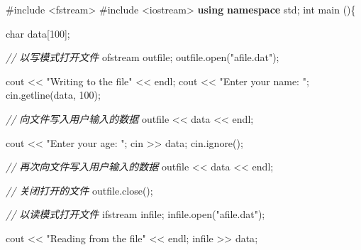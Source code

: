 \documentclass[
]{article}
\newenvironment{Shaded}{}{}
\newcommand{\CommentTok}[1]{\textcolor[rgb]{0.38,0.63,0.69}{\textit{#1}}}
\newcommand{\DataTypeTok}[1]{\textcolor[rgb]{0.56,0.13,0.00}{#1}}
\newcommand{\DecValTok}[1]{\textcolor[rgb]{0.25,0.63,0.44}{#1}}
\newcommand{\ImportTok}[1]{#1}
\newcommand{\KeywordTok}[1]{\textcolor[rgb]{0.00,0.44,0.13}{\textbf{#1}}}
\newcommand{\NormalTok}[1]{#1}
\newcommand{\OperatorTok}[1]{\textcolor[rgb]{0.40,0.40,0.40}{#1}}
\newcommand{\PreprocessorTok}[1]{\textcolor[rgb]{0.74,0.48,0.00}{#1}}
\newcommand{\StringTok}[1]{\textcolor[rgb]{0.25,0.44,0.63}{#1}}
\begin{document}
\begin{Shaded}
\begin{Highlighting}[]
\PreprocessorTok{\#include }\ImportTok{\textless{}fstream\textgreater{}}
\PreprocessorTok{\#include }\ImportTok{\textless{}iostream\textgreater{}}
\KeywordTok{using} \KeywordTok{namespace}\NormalTok{ std}\OperatorTok{;}
 \DataTypeTok{int}\NormalTok{ main }\OperatorTok{()\{}
    
   \DataTypeTok{char}\NormalTok{ data}\OperatorTok{[}\DecValTok{100}\OperatorTok{];}

   \CommentTok{// 以写模式打开文件}
\NormalTok{   ofstream outfile}\OperatorTok{;}
\NormalTok{   outfile}\OperatorTok{.}\NormalTok{open}\OperatorTok{(}\StringTok{"afile.dat"}\OperatorTok{);}

\NormalTok{   cout }\OperatorTok{\textless{}\textless{}} \StringTok{"Writing to the file"} \OperatorTok{\textless{}\textless{}}\NormalTok{ endl}\OperatorTok{;}
\NormalTok{   cout }\OperatorTok{\textless{}\textless{}} \StringTok{"Enter your name: "}\OperatorTok{;} 
\NormalTok{   cin}\OperatorTok{.}\NormalTok{getline}\OperatorTok{(}\NormalTok{data}\OperatorTok{,} \DecValTok{100}\OperatorTok{);}

   \CommentTok{// 向文件写入用户输入的数据}
\NormalTok{   outfile }\OperatorTok{\textless{}\textless{}}\NormalTok{ data }\OperatorTok{\textless{}\textless{}}\NormalTok{ endl}\OperatorTok{;}

\NormalTok{   cout }\OperatorTok{\textless{}\textless{}} \StringTok{"Enter your age: "}\OperatorTok{;} 
\NormalTok{   cin }\OperatorTok{\textgreater{}\textgreater{}}\NormalTok{ data}\OperatorTok{;}
\NormalTok{   cin}\OperatorTok{.}\NormalTok{ignore}\OperatorTok{();}
   
   \CommentTok{// 再次向文件写入用户输入的数据}
\NormalTok{   outfile }\OperatorTok{\textless{}\textless{}}\NormalTok{ data }\OperatorTok{\textless{}\textless{}}\NormalTok{ endl}\OperatorTok{;}

   \CommentTok{// 关闭打开的文件}
\NormalTok{   outfile}\OperatorTok{.}\NormalTok{close}\OperatorTok{();}

   \CommentTok{// 以读模式打开文件}
\NormalTok{   ifstream infile}\OperatorTok{;} 
\NormalTok{   infile}\OperatorTok{.}\NormalTok{open}\OperatorTok{(}\StringTok{"afile.dat"}\OperatorTok{);} 
 
\NormalTok{   cout }\OperatorTok{\textless{}\textless{}} \StringTok{"Reading from the file"} \OperatorTok{\textless{}\textless{}}\NormalTok{ endl}\OperatorTok{;} 
\NormalTok{   infile }\OperatorTok{\textgreater{}\textgreater{}}\NormalTok{ data}\OperatorTok{;} 


\end{Highlighting}
\end{Shaded}
\end{document}
